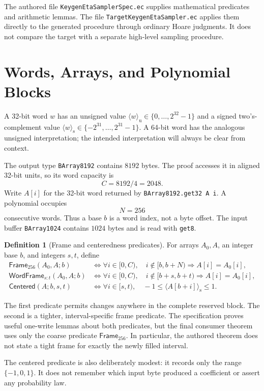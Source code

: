 \documentclass[11pt]{article}
\theoremstyle{definition}
\newtheorem{definition}{Definition}
\theoremstyle{plain}
\theoremstyle{remark}
\newcommand{\code}[1]{\nolinkurl{#1}}
\newcommand{\uint}[1]{\langle #1\rangle_{\mathrm u}}
\newcommand{\sint}[1]{\langle #1\rangle_{\mathrm s}}
\newcommand{\Frame}{\mathsf{Frame}_{256}}
\newcommand{\WordFrame}{\mathsf{WordFrame}}
\newcommand{\Centered}{\mathsf{Centered}}
\begin{document}
The authored file \code{KeygenEtaSamplerSpec.ec} supplies mathematical
predicates and arithmetic lemmas.  The file
\code{TargetKeygenEtaSampler.ec} applies them directly to the generated
procedure through ordinary Hoare judgments.  It does not compare the target
with a separate high-level sampling procedure.

\section{Words, Arrays, and Polynomial Blocks}

A 32-bit word $w$ has an unsigned value
$\uint{w}\in\{0,\ldots,2^{32}-1\}$ and a signed two's-complement value
$\sint{w}\in\{-2^{31},\ldots,2^{31}-1\}$.  A 64-bit word has the analogous
unsigned interpretation; the intended interpretation will always be clear
from context.

The output type \code{BArray8192} contains $8192$ bytes.  The proof accesses
it in aligned 32-bit units, so its word capacity is
\[
  C=8192/4=2048.
\]
Write $A[i]$ for the 32-bit word returned by
\code{BArray8192.get32 A i}.  A polynomial occupies
\[
  N=256
\]
consecutive words.  Thus a base $b$ is a word index, not a byte offset.  The
input buffer \code{BArray1024} contains $1024$ bytes and is read with
\code{get8}.

\begin{definition}[Frame and centeredness predicates]
For arrays $A_0,A$, an integer base $b$, and integers $s,t$, define
\begin{align*}
 \Frame(A_0,A;b)
   &\iff \forall i\in[0,C),\quad
      i\notin[b,b+N)\Longrightarrow A[i]=A_0[i],\\
 \WordFrame_{s:t}(A_0,A;b)
   &\iff \forall i\in[0,C),\quad
      i\notin[b+s,b+t)\Longrightarrow A[i]=A_0[i],\\
 \Centered(A;b,s,t)
   &\iff \forall i\in[s,t),\quad
      -1\le \sint{A[b+i]}\le1.
\end{align*}
\end{definition}

The first predicate permits changes anywhere in the complete reserved block.
The second is a tighter, interval-specific frame predicate.  The specification
proves useful one-write lemmas about both predicates, but the final consumer
theorem uses only the coarse predicate $\Frame$.  In particular, the authored
theorem does not state a tight frame for exactly the newly filled interval.

The centered predicate is also deliberately modest: it records only the
range $\{-1,0,1\}$.  It does not remember which input byte produced a
coefficient or assert any probability law.
\end{document}
